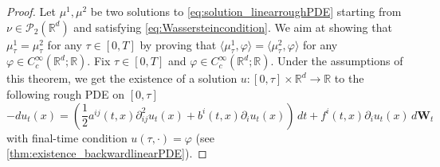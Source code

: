 \documentclass[10pt, a4paper]{article} %
\newcommand{\R}{\mathbb{R}}
\theoremstyle{definition}
\theoremstyle{plain}
\begin{document}
\begin{proof}
    Let $\mu^1,\mu^2$ be two solutions to \eqref{eq:solution_linearroughPDE} starting from $\nu \in \mathcal{P}_2(\R^d)$ and satisfying \eqref{eq:Wassersteincondition}. 
    We aim at showing that $\mu^1_\tau = \mu^2_\tau$ for any $\tau \in [0,T]$ by proving that $\langle \mu^1_\tau , \varphi \rangle = \langle \mu^2_\tau , \varphi \rangle$ for any $\varphi \in C^\infty_c(\R^d;\R)$. 
    Fix $\tau \in [0,T]$ and $\varphi \in C^\infty_c(\R^d;\R)$. 
    Under the assumptions of this theorem, we get the existence of a solution $u:[0,\tau] \times \R^d \to \R$ to the following rough PDE on $[0,\tau]$  \begin{equation} \label{eq:backwardroughPDE_duality}
        - du_t(x) = \left( \frac{1}{2}  a^{ij}(t,x) \partial^2_{ij} u_t(x)  + b^i(t,x) \partial_i u_t(x) \right) \, dt + f^i(t,x) \partial_i u_t(x) \, d\mathbf{W}_t  
    \end{equation}
    with final-time condition $u(\tau,\cdot) = \varphi$ (see \cref{thm:existence_backwardlinearPDE}). 
\end{proof}
\end{document}
